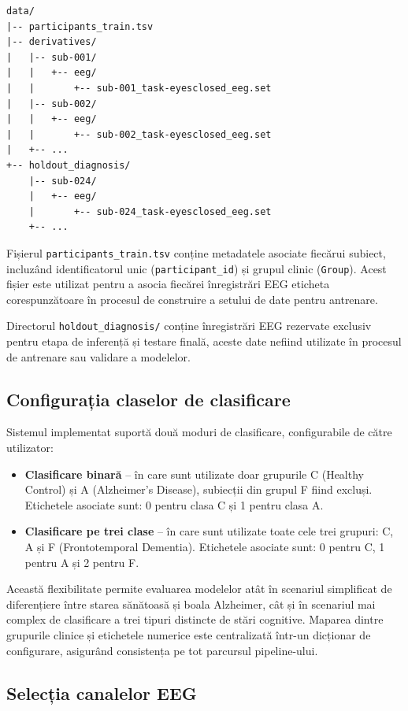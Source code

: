 \documentclass[12pt,a4paper]{report}
\theoremstyle{definition}
\theoremstyle{remark}
\begin{document}
\begin{verbatim}
data/
|-- participants_train.tsv
|-- derivatives/
|   |-- sub-001/
|   |   +-- eeg/
|   |       +-- sub-001_task-eyesclosed_eeg.set
|   |-- sub-002/
|   |   +-- eeg/
|   |       +-- sub-002_task-eyesclosed_eeg.set
|   +-- ...
+-- holdout_diagnosis/
    |-- sub-024/
    |   +-- eeg/
    |       +-- sub-024_task-eyesclosed_eeg.set
    +-- ...
\end{verbatim}

Fișierul \texttt{participants\_train.tsv} conține metadatele asociate fiecărui subiect, incluzând identificatorul unic (\texttt{participant\_id}) și grupul clinic (\texttt{Group}). Acest fișier este utilizat pentru a asocia fiecărei înregistrări EEG eticheta corespunzătoare în procesul de construire a setului de date pentru antrenare.

Directorul \texttt{holdout\_diagnosis/} conține înregistrări EEG rezervate exclusiv pentru etapa de inferență și testare finală, aceste date nefiind utilizate în procesul de antrenare sau validare a modelelor.

\subsection{Configurația claselor de clasificare}

Sistemul implementat suportă două moduri de clasificare, configurabile de către utilizator:

\begin{itemize}
    \item \textbf{Clasificare binară} -- în care sunt utilizate doar grupurile C (Healthy Control) și A (Alzheimer's Disease), subiecții din grupul F fiind excluși. Etichetele asociate sunt: 0 pentru clasa C și 1 pentru clasa A.
    \item \textbf{Clasificare pe trei clase} -- în care sunt utilizate toate cele trei grupuri: C, A și F (Frontotemporal Dementia). Etichetele asociate sunt: 0 pentru C, 1 pentru A și 2 pentru F.
\end{itemize}

Această flexibilitate permite evaluarea modelelor atât în scenariul simplificat de diferențiere între starea sănătoasă și boala Alzheimer, cât și în scenariul mai complex de clasificare a trei tipuri distincte de stări cognitive. Maparea dintre grupurile clinice și etichetele numerice este centralizată într-un dicționar de configurare, asigurând consistența pe tot parcursul pipeline-ului.

\subsection{Selecția canalelor EEG}
\label{sec:canal_selectie}
\end{document}
